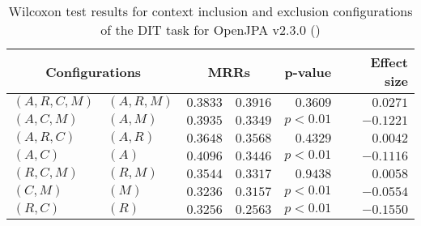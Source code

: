 
\begin{table}
\begin{spacing}{1.2}
\centering
\caption{Wilcoxon test results for context inclusion and exclusion configurations of the DIT task for OpenJPA v2.3.0 (\ctwo)}
\label{table:versus-wilcox-openjpa-dit-context}
\begin{tabular}{ll|rr|rr}
\toprule
      \multicolumn{2}{c|}{Configurations} &                \multicolumn{2}{c|}{MRRs} &             p-value & Effect size \\
\midrule
 $(A,R,C,M)$ &  $(A,R,M)$ &       $0.3833$ &  $\bm{0.3916}$ & $0.3609$ &    $0.0271$ \\
   $(A,C,M)$ &    $(A,M)$ &  $\bm{0.3935}$ &       $0.3349$ & $p<0.01$ &   $-0.1221$ \\
   $(A,R,C)$ &    $(A,R)$ &  $\bm{0.3648}$ &       $0.3568$ & $0.4329$ &    $0.0042$ \\
     $(A,C)$ &      $(A)$ &  $\bm{0.4096}$ &       $0.3446$ & $p<0.01$ &   $-0.1116$ \\
   $(R,C,M)$ &    $(R,M)$ &  $\bm{0.3544}$ &       $0.3317$ & $0.9438$ &    $0.0058$ \\
     $(C,M)$ &      $(M)$ &  $\bm{0.3236}$ &       $0.3157$ & $p<0.01$ &   $-0.0554$ \\
     $(R,C)$ &      $(R)$ &  $\bm{0.3256}$ &       $0.2563$ & $p<0.01$ &   $-0.1550$ \\
\bottomrule
\end{tabular}

\end{spacing}
\end{table}

